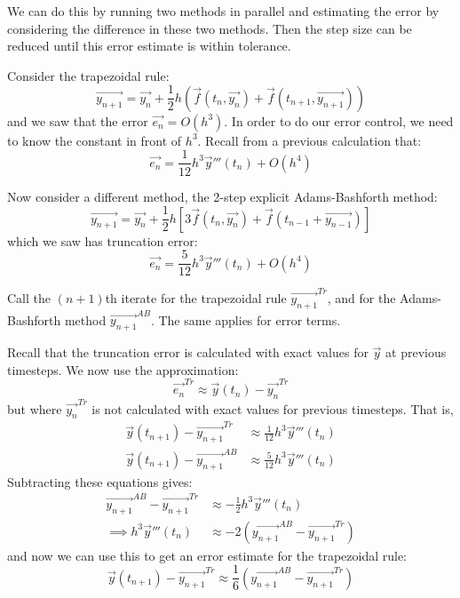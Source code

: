 \documentclass[../Main.tex]{subfiles}
\begin{document}
We can do this by running two methods in parallel and estimating the error by considering the difference in these two methods. Then the step size can be reduced until this error estimate is within tolerance.
\begin{example}
    Consider the trapezoidal rule:
    \begin{equation*}
        \vec{y_{n+1}} = \vec{y_n} + \frac12 h \left(\vec{f}(t_n, \vec{y_n}) + \vec{f}(t_{n+1}, \vec{y_{n+1}})\right)
    \end{equation*}
    and we saw that the error $\vec{e_n} = O(h^3)$. In order to do our error control, we need to know the constant in front of $h^3$. Recall from a previous calculation that:
    \begin{equation*}
        \vec{e_n} = \frac{1}{12} h^3 \vec{y}'''(t_n) + O(h^4)
    \end{equation*}

    Now consider a different method, the 2-step explicit Adams-Bashforth method:
    \begin{equation*}
        \vec{y_{n+1}} = \vec{y_n} + \frac12 h \left[3 \vec{f}(t_n, \vec{y_n}) + \vec{f}(t_{n-1} + \vec{y_{n-1}})\right]
    \end{equation*}
    which we saw has truncation error:
    \begin{equation*}
        \vec{e_n} = \frac{5}{12} h^3 \vec{y}'''(t_n) + O(h^4)
    \end{equation*}

    Call the $(n+1)$th iterate for the trapezoidal rule $\vec{y_{n+1}}^{Tr}$, and for the Adams-Bashforth method $\vec{y_{n+1}}^{AB}$. The same applies for error terms.
    
    Recall that the truncation error is calculated with exact values for $\vec{y}$ at previous timesteps. We now use the approximation:
    \begin{equation*}
        \vec{e_n}^{Tr} \approx \vec{y}(t_n) - \vec{y_{n}}^{Tr}
    \end{equation*}
    but where $\vec{y_n}^{Tr}$ is not calculated with exact values for previous timesteps. That is,
    \begin{align*}
        \vec{y}(t_{n+1}) - \vec{y_{n+1}}^{Tr} &\approx \frac1{12} h^3 \vec{y}'''(t_n) \\
        \vec{y}(t_{n+1}) - \vec{y_{n+1}}^{AB} &\approx \frac5{12} h^3 \vec{y}'''(t_n)
    \end{align*}
    Subtracting these equations gives:
    \begin{align*}
        \vec{y_{n+1}}^{AB} - \vec{y_{n+1}}^{Tr} &\approx -\frac12 h^3 \vec{y}'''(t_n) \\
        \implies h^3 \vec{y}'''(t_n) &\approx -2\left(\vec{y_{n+1}}^{AB} - \vec{y_{n+1}}^{Tr}\right)
    \end{align*}
    and now we can use this to get an error estimate for the trapezoidal rule:
    \begin{equation*}
        \vec{y}(t_{n+1}) - \vec{y_{n+1}}^{Tr} \approx \frac16 \left(\vec{y_{n+1}}^{AB} - \vec{y_{n+1}}^{Tr}\right)
    \end{equation*}
\end{example}
\end{document}
